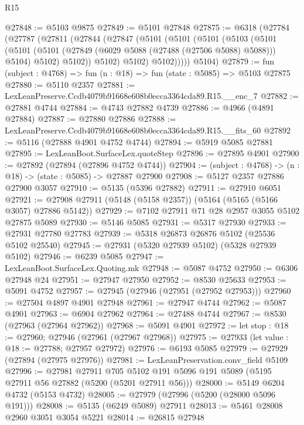 \begin{lexlean}{R15}
\begin{coremodule}
{{{{{{{{{{{@27848 := @5103 @9875
@27849 := @5101 @27848
@27875 := @6318
    (@27784
      (@27787
        (@27811
          (@27844
            (@27847
              (@5101
                (@5101
                  (@5101
                    (@5103
                      (@5101
                        (@5101
                          (@5101 (@27849 (@6029 @5088 (@27488 (@27506 @5088) @5088))) @5104)
                          @5102)
                        @5102))
                    @5102)
                  @5102)
                @5102)))))
      @5104)
@27879 := fun (subject : @4768) => fun (n : @18) => fun (state : @5085) => @5103 @27875
@27880 := @5110 @2357
@27881 := LexLeanPreserve.Ccdb4079b91668e608b0ecca3364cda89.R15.__enc_7
@27882 := @27881 @4744
@27884 := @4743 @27882 @4739
@27886 := @4966 (@4891 @27884)
@27887 := @27880 @27886
@27888 := LexLeanPreserve.Ccdb4079b91668e608b0ecca3364cda89.R15.__fits_60
@27892 := @5116 (@27888 @4901 @4752 @4744)
@27894 := @5919 @5085 @27881
@27895 := LexLeanBoot.SurfaceLex.quoteStep
@27896 := @27895 @4901
@27900 := @27892 (@27894 (@27896 @4752 @4744))
@27904 := (subject : @4768) -> (n : @18) -> (state : @5085) -> @27887 @27900
@27908 := @5127 @2357 @27886 @27900 @3057
@27910 := @5135 (@5396 @27882)
@27911 := @27910 @6051
@27921 := @27908 @27911 (@5148 (@5158 @2357)) (@5164 (@5165 (@5166 @3057) @27886 @5142))
@27929 := @7102 @27911 @71 @28 @2957 @3055 @5102 @27875 @5089
@27930 := @5146 @5085
@27931 := @5317 @27930
@27933 := @27931 @27780 @27783
@27939 := @5318 @26873 @26876 @5102 (@25536 @5102 @25540)
@27945 := @27931 (@5320 @27939 @5102) (@5328 @27939 @5102)
@27946 := @6239 @5085
@27947 := LexLeanBoot.SurfaceLex.Quoting.mk
@27948 := @5087 @4752
@27950 := @6306 @27948 @24
@27951 := @27947 @27950
@27952 := @8530 @25633
@27953 := @5091 @4752
@27957 := @27945 (@27946 (@27951 (@27952 @27953)))
@27960 := @27504 @4897 @4901 @27948
@27961 := @27947 @4744
@27962 := @5087 @4901
@27963 := @6904 @27962
@27964 := @27488 @4744
@27967 := @8530 (@27963 (@27964 @27962))
@27968 := @5091 @4901
@27972 := let stop : @18 := @27960; @27946 (@27961 (@27967 @27968))
@27975 := @27933 (let value : @18 := @27788; @27957 @27972)
@27976 := @6193 @5085
@27979 := @27929 (@27894 (@27975 @27976))
@27981 := LexLeanPreservation.conv_field @5109
@27996 := @27981
    @27911
    @705
    @5102
    @191
    @5096
    @191
    @5089
    (@5195 @27911 @56 @27882 (@5200 (@5201 @27911 @56)))
@28000 := @5149 @6204 @4732 (@5153 @4732)
@28005 := @27979 (@27996 (@5200 (@28000 @5096 @191)))
@28008 := @5135 (@6249 @5089) @27911
@28013 := @5461 @28008 @2960 @3051 @3054 @5221
@28014 := @26815 @27948
}}}}}}}}}}}
\end{coremodule}
\end{lexlean}
